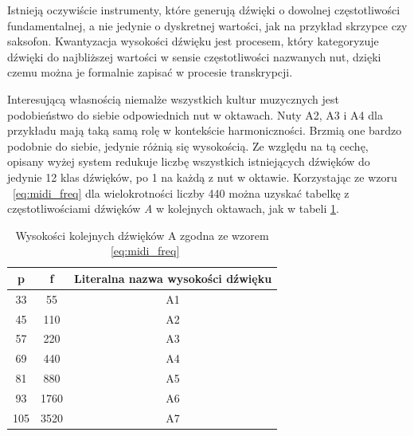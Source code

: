 \documentclass[12pt,a4paper,twoside]{mwart}
\begin{document}
Istnieją oczywiście instrumenty, które generują dźwięki o dowolnej częstotliwości fundamentalnej, a nie jedynie o dyskretnej wartości, jak na przykład skrzypce czy saksofon. Kwantyzacja wysokości dźwięku jest procesem, który kategoryzuje dźwięki do najbliższej wartości w sensie częstotliwości nazwanych nut, dzięki czemu można je formalnie zapisać w procesie transkrypcji.

Interesującą własnością niemalże wszystkich kultur muzycznych jest podobieństwo do siebie odpowiednich nut w oktawach. Nuty A2, A3 i A4 dla przykładu mają taką samą rolę w kontekście harmoniczności. Brzmią one bardzo podobnie do siebie, jedynie różnią się wysokością. Ze względu na tą cechę, opisany wyżej system redukuje liczbę wszystkich istniejących dźwięków do jedynie 12 klas dźwięków, po 1 na każdą z nut w oktawie. Korzystając ze wzoru ~\ref{eq:midi_freq} dla wielokrotności liczby 440 można uzyskać tabelkę z częstotliwościami dźwięków \textit{A} w kolejnych oktawach, jak w tabeli \ref{tab:FqMidi}.

\begin{table}[ht]
  \begin{center}
    \begin{tabular}{ |c|c|c| } 
    \hline
    p & f & Literalna nazwa wysokości dźwięku\\
    \hline
    33 & 55 & A1\\
    45 & 110 & A2\\
    57 & 220 & A3\\
    69 & 440 & A4\\
    81 & 880 & A5\\
    93 & 1760 & A6\\
    105 & 3520 & A7\\
    \hline
    \end{tabular}
  \end{center}
  \caption{Wysokości kolejnych dźwięków A zgodna ze wzorem ~\ref{eq:midi_freq}}
  \label{tab:FqMidi}
\end{table}
\end{document}

